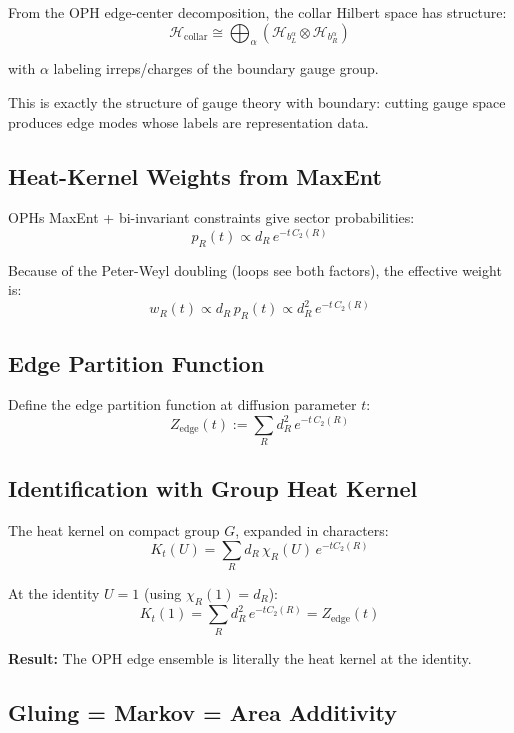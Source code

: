 From the OPH edge-center decomposition, the collar Hilbert space has structure: \[\mathcal{H}_{\text{collar}} \cong \bigoplus_{\alpha} \left(\mathcal{H}_{b_L^\alpha} \otimes \mathcal{H}_{b_R^\alpha}\right)\]

with \(\alpha\) labeling irreps/charges of the boundary gauge group.

This is exactly the structure of gauge theory with boundary: cutting gauge space produces edge modes whose labels are representation data.

\subsection{Heat-Kernel Weights from MaxEnt}\label{42-heat-kernel-weights-from-maxent}

OPH\textquotesingle s MaxEnt + bi-invariant constraints give sector probabilities: \[p_R(t) \propto d_R \, e^{-t \, C_2(R)}\]

Because of the Peter-Weyl doubling (loops see both factors), the effective weight is: \[w_R(t) \propto d_R \, p_R(t) \propto d_R^2 \, e^{-t \, C_2(R)}\]

\subsection{Edge Partition Function}\label{43-edge-partition-function}

Define the edge partition function at diffusion parameter \(t\): \[Z_{\text{edge}}(t) := \sum_R d_R^2 \, e^{-t \, C_2(R)}\]

\subsection{Identification with Group Heat Kernel}\label{44-identification-with-group-heat-kernel}

The heat kernel on compact group \(G\), expanded in characters: \[K_t(U) = \sum_R d_R \, \chi_R(U) \, e^{-t C_2(R)}\]

At the identity \(U = 1\) (using \(\chi_R(1) = d_R\)): \[K_t(1) = \sum_R d_R^2 \, e^{-t C_2(R)} = Z_{\text{edge}}(t)\]

\textbf{Result:} The OPH edge ensemble is literally the heat kernel at the identity.

\subsection{Gluing = Markov = Area Additivity}\label{45-gluing--markov--area-additivity}

